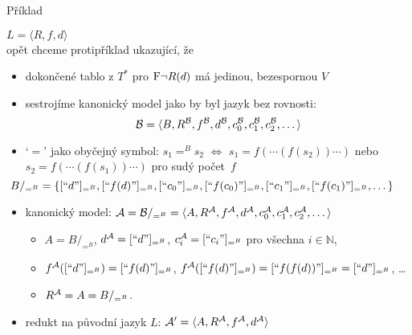 \documentclass{beamer}
\begin{document}
\begin{frame}{Příklad}

     $L=\langle R,f,d \rangle$ \\ opět chceme protipříklad ukazující, že 

    \begin{itemize}
        \item dokončené tablo \alert{z $T^*$} pro $\mathrm{F}\neg R(d)$ má jedinou, bezespornou $V$
        \item sestrojíme kanonický model jako by byl jazyk bez rovnosti:
        $$
        \mathcal{B}=\langle B,R^{\mathcal{B}},f^{\mathcal{B}},d^{\mathcal{B}},c_0^{\mathcal{B}},c_1^{\mathcal{B}},c_2^{\mathcal{B}},\dots\rangle
        $$
        \item \alert{`$=$' jako obyčejný symbol:} $s_1=^B s_2$ $\Leftrightarrow$ $s_1=f(\cdots (f(s_2))\cdots)$ nebo \small$s_2=f(\cdots (f(s_1))\cdots)$ pro sudý počet~$f$    
        $$\hspace{-1cm}
        B/_{=^B} = \{[\text{``$d$''}]_{=^B},[\text{``$f(d)$''}]_{=^B},[\text{``$c_0$''}]_{=^B},[\text{``$f(c_0)$''}]_{=^B},[\text{``$c_1$''}]_{=^B},[\text{``$f(c_1)$''}]_{=^B},\dots\}
        $$    
        \item \alert{kanonický model}: 
        $\mathcal{A}=\mathcal{B}/_{=^B}=\langle A,R^{\mathcal{A}},f^{\mathcal{A}},d^{\mathcal{A}},c_0^{\mathcal{A}},c_1^{\mathcal{A}},c_2^{\mathcal{A}},\dots\rangle$
        \begin{itemize}
            \item $A=B/_{=^B}$, $d^{\mathcal{A}}=[\text{``$d$''}]_{=^B}$, $c^{\mathcal{A}}_i=[\text{``$c_i$''}]_{=^B}$ pro všechna $i\in \mathbb N$,
            \item $f^{\mathcal{A}}([\text{``$d$''}]_{=^B})=[\text{``$f(d)$''}]_{=^B}$, $f^{\mathcal{A}}([\text{``$f(d)$''}]_{=^B})=[\text{``$f(f(d))$''}]_{=^B}=[\text{``$d$''}]_{=^B}$, \dots
            \item $R^{\mathcal{A}}=A=B/_{=^B}$.
        \end{itemize}        
        \item redukt na původní jazyk $L$: $\mathcal{A}'=\langle A, R^{\mathcal{A}}, f^{\mathcal{A}}, d^{\mathcal{A}}\rangle$
    \end{itemize}

\end{frame}
\end{document}
